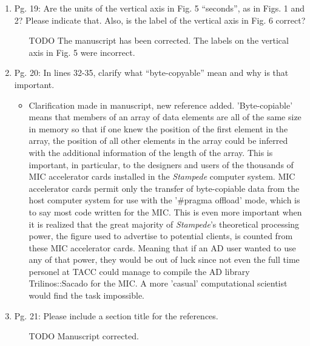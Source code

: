\documentclass{article}
\begin{document}
\begin{enumerate}
    \item
        Pg. 19: Are the units of the vertical axis in Fig. 5 “seconds”, as in Figs. 1 and 2?
        Please indicate that. Also, is the label of the vertical axis in Fig. 6 correct?

{\color{red}  
\begin{itemize}
     \item
[TODO]
        The manuscript has been corrected. The labels on the vertical axis in Fig. 5 were incorrect. 
  \end{itemize}}

\item
Pg. 20: In lines 32-35, clarify what “byte-copyable” mean and why is that important.

{\color{red}  
\begin{itemize}
     \item
     Clarification made in manuscript, new reference added. 
     'Byte-copiable' means that members of an array of data elements are all of
     the same size in memory so that if one knew the position of the first
     element in the array, the position of all other elements in the array
     could be inferred with the additional information of the length of the
     array. This is important, in particular, to the designers and users of the
     thousands of MIC accelerator cards installed in the \emph{Stampede}
     computer system. MIC accelerator cards permit only the transfer of
     byte-copiable data from the host computer system for use with the '#pragma
     offload' mode, which is to say most code written for the MIC. This is even
     more important when it is realized that the great majority of
     \emph{Stampede}'s theoretical processing power, the figure used to advertise to potential clients, is counted from these MIC
     accelerator cards. Meaning that if an AD user wanted to use any of that
     power, they would be out of luck since not even the full time personel at
     TACC could manage to compile the AD library Trilinos::Sacado for the MIC.
     A more 'casual' computational scientist would find the task impossible.
  \end{itemize}}

 \item
    Pg. 21: Please include a section title for the references.

{\color{red}  
\begin{itemize}
     \item
         [TODO]
         Manuscript corrected.
  \end{itemize}}


\end{enumerate}
\end{document}
